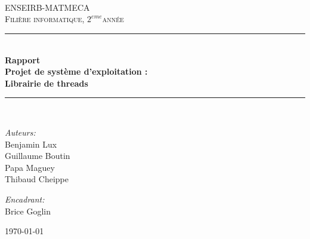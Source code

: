 \documentclass[a4paper
,oneside,11pt]{article}
\def\titre{Rapport\\Projet de système d'exploitation :\\Librairie de threads}
\def\filiere{informatique}
\def\annee{$2^{eme}$}
\def\equipe{Benjamin Lux \\ Guillaume Boutin \\ Papa Maguey \\ Thibaud Cheippe}
\def\encadrant{Brice Goglin}
\newcommand{\HRule}{\rule{\linewidth}{0.5mm}}
\begin{document}
\begin{titlepage}

\begin{center}


\begin{center}
\end{center}
~\\
~\\
~\\
\textsc{\LARGE ENSEIRB-MATMECA}\\[1cm]

\textsc{\Large {Fili\`ere \filiere, \annee ann\'ee}}\\[0.5cm]

\HRule \\[0.4cm]
{ \huge \bfseries \titre}\\[0.4cm]


\HRule \\[1.5cm]


\begin{minipage}{0.4\textwidth}
\begin{flushleft} \large
\emph{Auteurs:}\\
\equipe
\end{flushleft}
\end{minipage}
\begin{minipage}{0.4\textwidth}
\begin{flushright} \large
\emph{Encadrant:} \\
\encadrant
\end{flushright}
\end{minipage}


\vfill

{\large \today}

\end{center}

\end{titlepage}
\newpage
\end{document}
